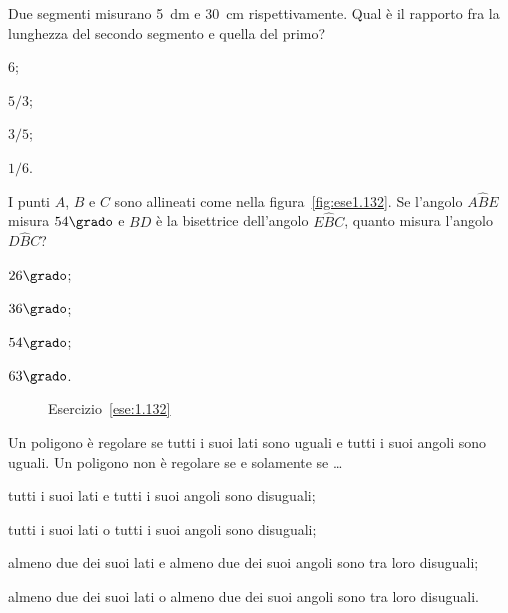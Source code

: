 \begin{esercizio}
Due segmenti misurano 5~dm e 30~cm rispettivamente. Qual è il 
rapporto fra la lunghezza del secondo segmento e quella del primo?
\begin{multicols}{4}
\begin{enumeratea}
\item 6;
\item \(5/3\);
\item \(3/5\);
\item \(1/6\).
\end{enumeratea}
\end{multicols}
\end{esercizio}

\begin{esercizio}
I punti \(A\), \(B\) e \(C\) sono allineati come nella 
figura~\ref{fig:ese1.132}. Se l'angolo \(A\widehat{B}E\) misura 
\(54\grado\) e \(BD\) è la bisettrice dell'angolo \(E\widehat{B}C\), quanto 
misura l'angolo \(D\widehat{B}C\)?
\begin{multicols}{4}
\begin{enumeratea}
\item \(26\grado\);
\item \(36\grado\);
\item \(54\grado\);
\item \(63\grado\).
\end{enumeratea}
\end{multicols}
\end{esercizio}


\begin{inaccessibleblock}
 \begin{figure}[htb]
 \centering
 \caption{Esercizio~\ref{ese:1.132}}%
\end{figure}
\end{inaccessibleblock}


\begin{esercizio}
Un poligono è regolare se tutti i suoi lati sono uguali e tutti i 
suoi angoli sono uguali. Un poligono non è regolare se e solamente se 
\ldots
\begin{enumeratea}
\item tutti i suoi lati e tutti i suoi angoli sono disuguali;
\item tutti i suoi lati o tutti i suoi angoli sono disuguali;
\item almeno due dei suoi lati e almeno due dei suoi angoli sono tra 
loro disuguali;
\item almeno due dei suoi lati o almeno due dei suoi angoli sono tra 
loro disuguali.
\end{enumeratea}
\end{esercizio}


